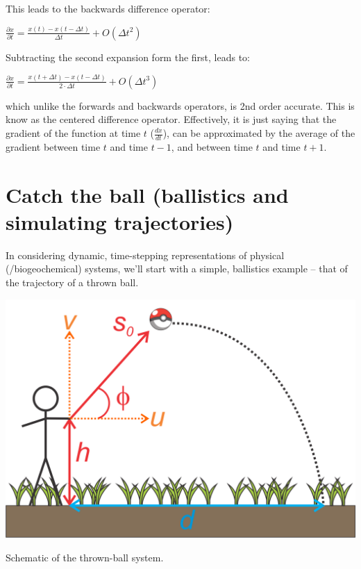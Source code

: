 \documentclass{tufte-book} %
\begin{document}
\noindent This leads to the backwards difference operator:

\vspace{2mm}\(
\frac{\partial x}{\partial t} = \frac{x(t)-x(t-\Delta t)}{\Delta t} + O(\Delta t^{2})
\)\vspace{2mm}

\noindent Subtracting the second expansion form the first, leads to:

\vspace{2mm}\(
\frac{\partial x}{\partial t} = \frac{x(t+\Delta t)-x(t-\Delta t)}{2\cdot\Delta t} + O(\Delta t^{3})
\)\vspace{2mm}

\noindent which unlike the forwards and backwards operators, is 2nd order accurate. This is know as the centered difference operator. Effectively, it is just saying that the gradient of the function at time \(t\) (\(\frac{dx}{dt}\)), can be approximated by the average of the gradient between time \(t\) and time \(t-1\), and between  time \(t\) and time \(t+1\).


\newpage


\section{Catch the ball (ballistics and simulating trajectories)}

In considering dynamic, time-stepping representations of physical (/biogeochemical) systems, we'll start with a simple, ballistics example -- that of the trajectory of a thrown ball.

\begin{marginfigure}[0.0in]
\includegraphics[width=\linewidth]{ch9-ball.png}
\caption{Schematic of the thrown-ball system.}
\label{fig:ch9-ball}
\end{marginfigure}
\end{document}
